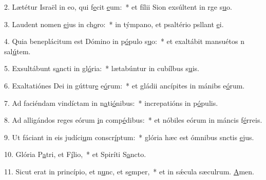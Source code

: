 2. Lætétur Israël in eo, qui f\uline{e}cit \uline{e}um:~* et fílii Sion exsúltent in rge s\uline{u}o.\par 
3. Laudent nomen \uline{e}jus in ch\uline{o}ro:~* in týmpano, et psaltério psllant \uline{e}i.\par 
4. Quia beneplácitum est Dómino in p\uline{ó}pulo s\uline{u}o:~* et exaltábit mansuétos n sal\uline{ú}tem.\par 
5. Exsultábunt s\uline{a}ncti in gl\uline{ó}ria:~* lætabúntur in cubílbus s\uline{u}is.\par 
6. Exaltatiónes Dei in gúttur\uline{e} e\uline{ó}rum:~* et gládii ancípites in mánibs e\uline{ó}rum.\par 
7. Ad faciéndam vindíctam in n\uline{a}ti\uline{ó}nibus:~* increpatións in p\uline{ó}pulis.\par 
8. Ad alligándos reges eórum \uline{i}n comp\uline{é}dibus:~* et nóbiles eórum in máncis f\uline{é}rreis.\par 
9. Ut fáciant in eis judíci\uline{u}m conscr\uline{í}ptum:~* glória hæc est ómnibus snctis \uline{e}jus.\par 
10. Glória P\uline{a}tri, et F\uline{í}lio,~* et Spiríti S\uline{a}ncto.\par 
11. Sicut erat in princípio, et n\uline{u}nc, et s\uline{e}mper,~* et in sǽcula sæculrum. \uline{A}men.\par 
